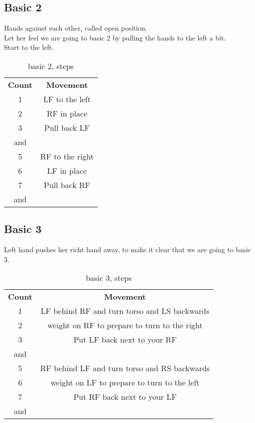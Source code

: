 \subsection{Basic 2}
Hands against each other, called open position.\\
Let her feel we are going to basic 2 by pulling the hands to the left a bit.\\
Start to the left.\\
\begin{table}[H]
\centering
\begin{tabular}{cc}
  \toprule
  \textbf{Count} & \textbf{Movement}\\
  \cmidrule(lr){1-1}\cmidrule(lr){2-2}
  1 & LF to the left\\
  2 & RF in place\\
  3 & Pull back LF\\
  and & \\
  5 & RF to the right\\
  6 & LF in place\\
  7 & Pull back RF\\
  and & \\
  \bottomrule
\end{tabular}
\label{basic2_steps}
\caption{basic 2, steps}
\end{table}

\subsection{Basic 3}
Left hand pushes her richt hand away, to make it clear that we are going to basic 3.\\
\begin{table}[H]
\centering
\begin{tabular}{cc}
  \toprule
  \textbf{Count} & \textbf{Movement}\\
  \cmidrule(lr){1-1}\cmidrule(lr){2-2}
  1 & LF behind RF and turn torso and LS backwards\\
  2 & weight on RF to prepare to turn to the right\\
  3 & Put LF back next to your RF\\
  and & \\
  5 & RF behind LF and turn torso and RS backwards\\
  6 & weight on LF to prepare to turn to the left\\
  7 & Put RF back next to your LF\\
  and & \\
  \bottomrule
\end{tabular}
\label{basic3_steps}
\caption{basic 3, steps}
\end{table}

